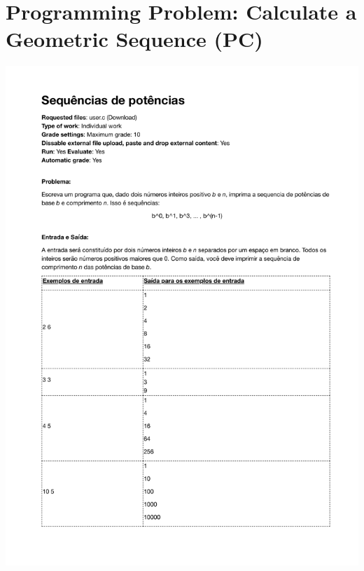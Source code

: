 \section{Programming Problem: Calculate a Geometric Sequence (PC)}
\label{annex:second-study-pC}
\includegraphics[page=1,width=1\textwidth]{images/annex/second-study-pC.pdf}

\newpage
